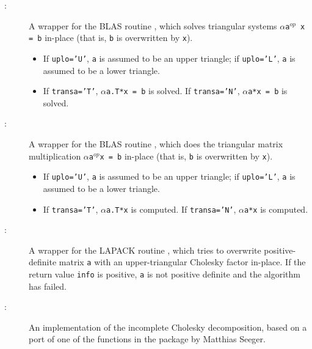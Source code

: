 \documentclass{manual}
\begin{document}
\begin{description}

    \item[:] A wrapper for the BLAS routine , which solves triangular systems \texttt{$\alpha$a$^{op}$ x = b} in-place (that is, \texttt{b} is overwritten by \texttt{x}). 
    \begin{itemize}
        \item If \texttt{uplo='U'}, \texttt{a} is assumed to be an upper triangle; if \texttt{uplo='L'}, \texttt{a} is assumed to be a lower triangle.
        \item If \texttt{transa='T'}, \texttt{$\alpha$a.T*x = b} is solved. If \texttt{transa='N'}, \texttt{$\alpha$a*x = b} is solved.
    \end{itemize}
    
    \item[:] A wrapper for the BLAS routine , which does the triangular matrix multiplication \texttt{$\alpha$a$^{op}$x = b} in-place (that is, \texttt{b} is overwritten by \texttt{x}).
    \begin{itemize}
        \item If \texttt{uplo='U'}, \texttt{a} is assumed to be an upper triangle; if \texttt{uplo='L'}, \texttt{a} is assumed to be a lower triangle.
        \item If \texttt{transa='T'}, \texttt{$\alpha$a.T*x} is computed. If \texttt{transa='N'}, \texttt{$\alpha$a*x} is computed.
    \end{itemize}
    
    \item[:] A wrapper for the LAPACK routine , which tries to overwrite positive-definite matrix \texttt{a} with an upper-triangular Cholesky factor in-place. If the return value \texttt{info} is positive, \texttt{a} is not positive definite and the algorithm has failed.
    
    \item[:] An implementation of the incomplete Cholesky decomposition, based on a port of one of the functions in the  package by Matthias Seeger. 
    

\end{description}
\end{document}
